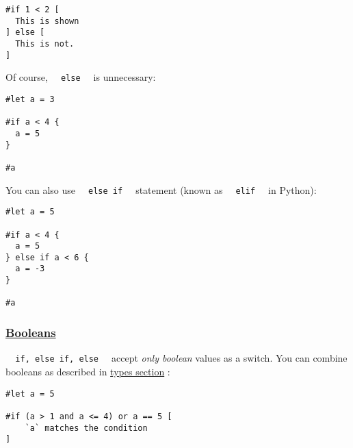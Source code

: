 \begin{verbatim}
#if 1 < 2 [
  This is shown
] else [
  This is not.
]
\end{verbatim}

\pandocbounded{}

Of course, \texttt{\ }{\texttt{\ else\ }}\texttt{\ } is unnecessary:

\begin{verbatim}
#let a = 3

#if a < 4 {
  a = 5
}

#a
\end{verbatim}

\pandocbounded{}

You can also use \texttt{\ }{\texttt{\ else\ if\ }}\texttt{\ } statement
(known as \texttt{\ }{\texttt{\ elif\ }}\texttt{\ } in Python):

\begin{verbatim}
#let a = 5

#if a < 4 {
  a = 5
} else if a < 6 {
  a = -3
}

#a
\end{verbatim}

\pandocbounded{}

\subsubsection{\texorpdfstring{\hyperref[booleans]{Booleans}}{Booleans}}\label{booleans}

\texttt{\ }{\texttt{\ if,\ else\ if,\ else\ }}\texttt{\ } accept
\emph{only boolean} values as a switch. You can combine booleans as
described in \href{basics/scripting/./types.html\#boolean-bool}{types
section} :

\begin{verbatim}
#let a = 5

#if (a > 1 and a <= 4) or a == 5 [
    `a` matches the condition
]
\end{verbatim}

\pandocbounded{}

